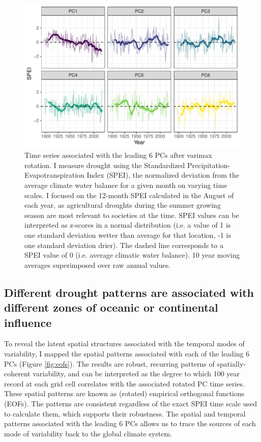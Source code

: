 \documentclass[11pt]{wlscirep}
\begin{document}
\begin{figure}[!ht]
\centering
\includegraphics[width=\linewidth]{figures/pc_obs.pdf}
\caption{Time series associated with the leading 6 PCs after varimax rotation. I measure drought using the Standardized Precipitation-Evapotranspiration Index (SPEI), the normalized deviation from the average climate water balance for a given month on varying time scales. I focused on the 12-month SPEI calculated in the August of each year, as agricultural droughts during the summer growing season are most relevant to societies at the time. SPEI values can be interpreted as z-scores in a normal distribution (i.e. a value of 1 is one standard deviation wetter than average for that location, -1 is one standard deviation drier). The dashed line corresponds to a SPEI value of 0 (i.e. average climatic water balance). 10 year moving averages superimposed over raw annual values.}
\label{fig:pc-obs}
\end{figure}

\subsection*{Different drought patterns are associated with different zones of oceanic or continental influence}

To reveal the latent spatial structures associated with the temporal modes of variability, I mapped the spatial patterns associated with each of the leading 6 PCs (Figure \ref{fig:eofs}). The results are robust, recurring patterns of spatially-coherent variability, and can be interpreted as the degree to which 100 year record at each grid cell correlates with the associated rotated PC time series. These spatial patterns are known as (rotated) empirical orthogonal functions (EOFs). The patterns are consistent regardless of the exact SPEI time scale used to calculate them, which supports their robustness. The spatial and temporal patterns associated with the leading 6 PCs allows us to trace the sources of each mode of variability back to the global climate system.
\end{document}
